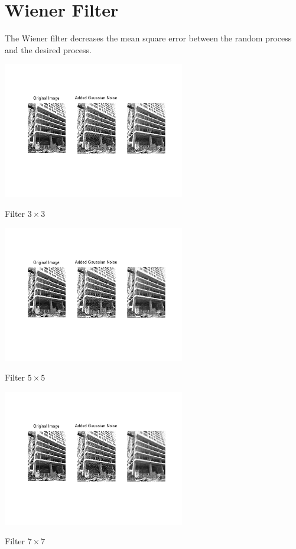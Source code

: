 \section{Wiener Filter}
The Wiener filter decreases the mean square error between the random process and the desired process.

\vspace{0.5cm}
\begin{center}
\includegraphics{Wienec3.png}

Filter $3\times3$

\includegraphics{Wienec5.png}

Filter $5\times5$

\includegraphics{Wienec7.png}

Filter $7\times7$

\end{center}






